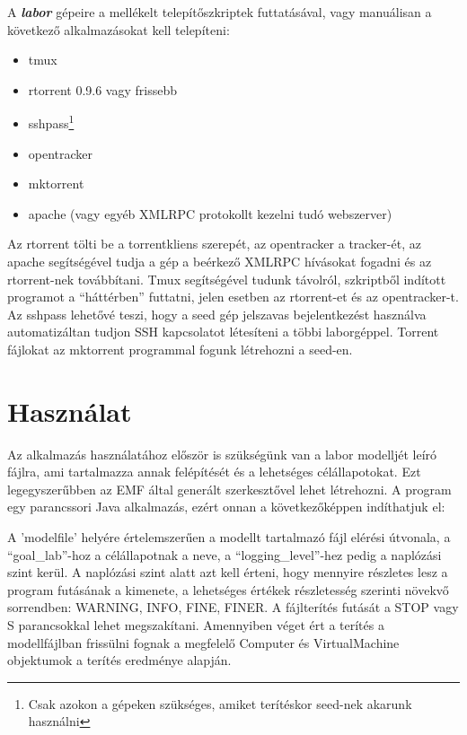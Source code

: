 A \textit{\textbf{labor}} gépeire a mellékelt telepítőszkriptek futtatásával, vagy manuálisan a következő alkalmazásokat kell telepíteni:
\begin{itemize}
  \item tmux
  \item rtorrent 0.9.6 vagy frissebb
  \item	sshpass\footnote{Csak azokon a gépeken szükséges, amiket terítéskor seed-nek akarunk használni}
  \item opentracker\footnotemark[1]
  \item mktorrent\footnotemark[1]
  \item apache (vagy egyéb XMLRPC protokollt kezelni tudó webszerver)
\end{itemize}
Az rtorrent tölti be a torrentkliens szerepét, az opentracker a tracker-ét, az apache segítségével tudja a gép a beérkező XMLRPC hívásokat fogadni és az rtorrent-nek továbbítani. Tmux segítségével tudunk távolról, szkriptből indított programot a ``háttérben'' futtatni, jelen esetben az rtorrent-et és az opentracker-t. Az sshpass lehetővé teszi, hogy a seed gép jelszavas bejelentkezést használva automatizáltan tudjon SSH kapcsolatot létesíteni a többi laborgéppel. Torrent fájlokat az mktorrent programmal fogunk létrehozni a seed-en.

\section{Használat}

Az alkalmazás használatához először is szükségünk van a labor modelljét leíró fájlra, ami tartalmazza annak felépítését és a lehetséges célállapotokat. Ezt legegyszerűbben az EMF által generált szerkesztővel lehet létrehozni. A program egy parancssori Java alkalmazás, ezért onnan a következőképpen indíthatjuk el:


A 'modelfile' helyére értelemszerűen a modellt tartalmazó fájl elérési útvonala, a ``goal\_lab''-hoz a célállapotnak a neve, a ``logging\_level''-hez pedig a naplózási szint kerül. A naplózási szint alatt azt kell érteni, hogy mennyire részletes lesz a program futásának a kimenete, a lehetséges értékek részletesség szerinti növekvő sorrendben: WARNING, INFO, FINE, FINER.
A fájlterítés futását a STOP vagy S parancsokkal lehet megszakítani. Amennyiben véget ért a terítés a modellfájlban frissülni fognak a megfelelő Computer és VirtualMachine objektumok a terítés eredménye alapján.


